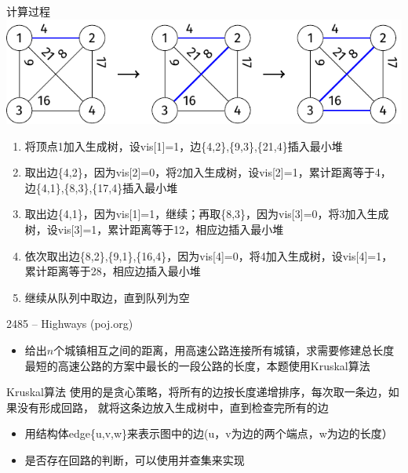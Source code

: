 \begin{frame}{计算过程}
    \includegraphics{fig/8-1.pdf}
\begin{enumerate}[(1)]
    \item 将顶点1加入生成树，设vis[1]=1，边\{4,2\},\{9,3\},\{21,4\}插入最小堆\pause
    \item 取出边\{4,2\}，因为vis[2]=0，将2加入生成树，设vis[2]=1，累计距离等于4，边\{4,1\},\{8,3\},\{17,4\}插入最小堆\pause
    \item 取出边\{4,1\}，因为vis[1]=1，继续；再取\{8,3\}，因为vis[3]=0，将3加入生成树，设vis[3]=1，累计距离等于12，相应边插入最小堆\pause
    \item 依次取出边\{8,2\},\{9,1\},\{16,4\}，因为vis[4]=0，将4加入生成树，设vis[4]=1，累计距离等于28，相应边插入最小堆\pause
    \item 继续从队列中取边，直到队列为空
\end{enumerate}
\end{frame}
\begin{frame}{2485 -- Highways (poj.org)}
    \begin{itemize}
        \item 给出$n$个城镇相互之间的距离，用高速公路连接所有城镇，求需要修建总长度最短的高速公路的方案中最长的一段公路的长度，本题使用Kruskal算法
    \end{itemize}    
    \begin{block}{Kruskal算法}
        使用的是贪心策略，将所有的边按长度递增排序，每次取一条边，如果没有形成回路， 就将这条边放入生成树中，直到检查完所有的边
    \end{block}
    \begin{itemize}
        \item 用结构体edge\{u,v,w\}来表示图中的边(u，v为边的两个端点，w为边的长度）
        \item 是否存在回路的判断，可以使用并查集来实现
    \end{itemize}
\end{frame}    
